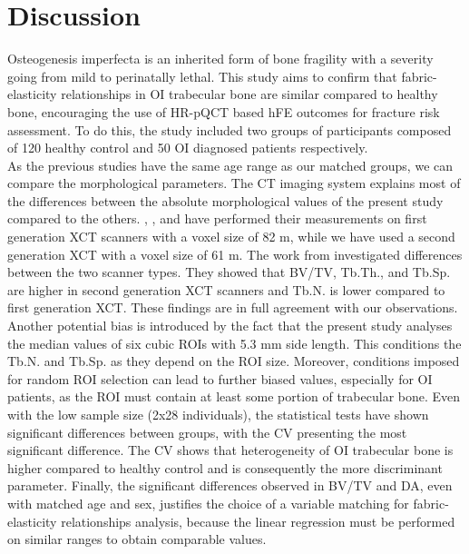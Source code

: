 \documentclass[a4paper,fleqn]{DC_ArtStyle}
\begin{document}
\section{Discussion}
Osteogenesis imperfecta is an inherited form of bone fra\-gility with a severity going from mild to perinatally lethal. This study aims to confirm that fabric-elasticity relationships in OI trabecular bone are similar compared to healthy bone, encouraging the use of HR-pQCT based hFE outcomes for fracture risk assessment. To do this, the study included two groups of participants composed of 120 healthy control and 50 OI diagnosed patients respectively. \\
As the previous studies \cite{Folkestad2012,Kocijan2015,Rolvien2018} have the same age range as our matched groups, we can compare the morphological parameters. The CT imaging system explains most of the differences between the absolute morphological values of the present study compared to the others. \citeauthor{Folkestad2012}\cite{Folkestad2012}, \citeauthor{Kocijan2015}\cite{Kocijan2015}, and \citeauthor{Rolvien2018}\cite{Rolvien2018} have performed their measurements on first generation XCT scanners with a voxel size of 82 \si{\micro}m, while we have used a second generation XCT with a voxel size of 61 \si{\micro}m. The work from \citeauthor{Agarwal2016}\cite{Agarwal2016} investigated differences between the two scanner types. They showed that BV/TV, Tb.Th., and Tb.Sp. are higher in second generation XCT scanners and Tb.N. is lower compared to first generation XCT. These findings are in full agreement with our observations. Another potential bias is introduced by the fact that the present study analyses the median values of six cubic ROIs with 5.3 mm side length. This conditions the Tb.N. and Tb.Sp. as they depend on the ROI size. Moreover, conditions imposed for random ROI selection can lead to further biased values, especially for OI patients, as the ROI must contain at least some portion of trabecular bone. Even with the low sample size (2x28 individuals), the statistical tests have shown significant differences between groups, with the CV presenting the most significant difference. The CV shows that heterogeneity of OI trabecular bone is higher compared to healthy control and is consequently the more discriminant parameter. Finally, the significant differences observed in BV/TV and DA, even with matched age and sex, justifies the choice of a variable matching for fabric-elasticity relationships analysis, because the linear regression must be performed on similar ranges to obtain comparable values. \\
\end{document}
